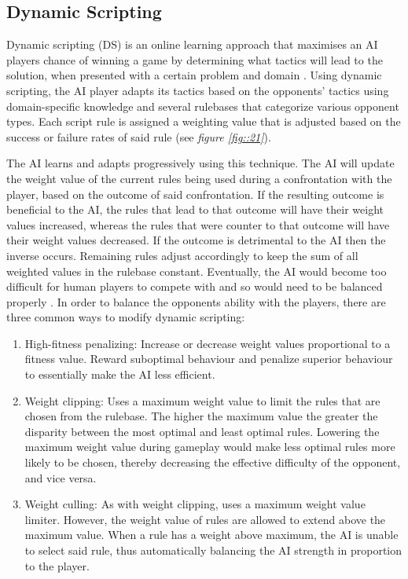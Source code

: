 \documentclass[journal]{IEEEtran}
\begin{document}
\subsection{Dynamic Scripting}
Dynamic scripting (DS) is an online learning approach that maximises an AI players chance of winning a game by determining what tactics will lead to the solution, when presented with a certain problem and domain \cite{spronck2004online}. Using dynamic scripting, the AI player adapts its tactics based on the opponents' tactics using domain-specific knowledge and several rulebases that categorize various opponent types. Each script rule is assigned a weighting value that is adjusted based on the success or failure rates of said rule (see \textit{figure \ref{fig::21}}).

The AI learns and adapts progressively using this technique. The AI will update the weight value of the current rules being used during a confrontation with the player, based on the outcome of said confrontation. If the resulting outcome is beneficial to the AI, the rules that lead to that outcome will have their weight values increased, whereas the rules that were counter to that outcome will have their weight values decreased. If the outcome is detrimental to the AI then the inverse occurs. Remaining rules adjust accordingly to keep the sum of all weighted values in the rulebase constant.
Eventually, the AI would become too difficult for human players to compete with and so would need to be balanced properly \cite{liden2003artificial}. In order to balance the opponents ability with the players, there are three common ways to modify dynamic scripting:

\begin{enumerate}
\item High-fitness penalizing: Increase or decrease weight values proportional to a fitness value. Reward suboptimal behaviour and penalize superior behaviour to essentially make the AI less efficient.
\item Weight clipping: Uses a maximum weight value to limit the rules that are chosen from the rulebase. The higher the maximum value the greater the disparity between the most optimal and least optimal rules. Lowering the maximum weight value during gameplay would make less optimal rules more likely to be chosen, thereby decreasing the effective difficulty of the opponent, and vice versa.
\item Weight culling: As with weight clipping, uses a maximum weight value limiter. However, the weight value of rules are allowed to extend above the maximum value. When a rule has a weight above maximum, the AI is unable to select said rule, thus automatically balancing the AI strength in proportion to the player.
\end{enumerate}
\end{document}
